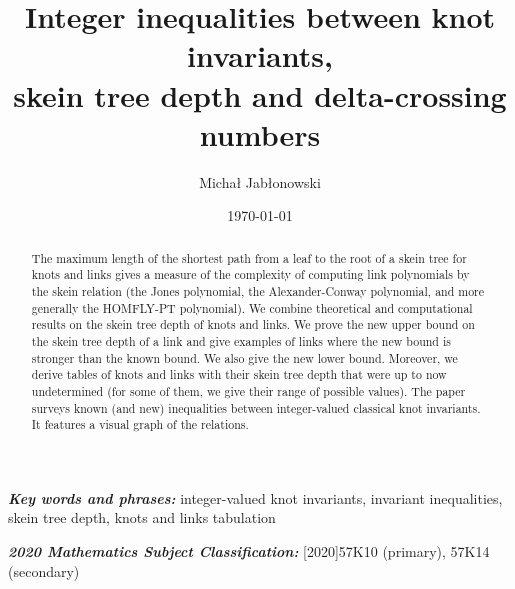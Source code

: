 \documentclass[pdftex, a4paper, 12pt, oneside]{amsart}
\numberwithin{equation}{section}
\theoremstyle{plain}
\theoremstyle{definition}
\providecommand{\keywords}[1]{\textbf{\textit{Key words and phrases:}} #1}
\providecommand{\subjclass}[1]{\textbf{\textit{2020 Mathematics Subject Classification:}} #1}
\begin{document}
	
	
	
\title[Inequalities between knot invariants, skein tree depth and delta-crossing numbers]{Integer inequalities between knot invariants,\\ skein tree depth and delta-crossing numbers}

\author{Micha{\l} Jab{\l}onowski}

\address{Institute of Mathematics, Faculty of Mathematics, Physics and Informatics,\newline University of Gda\'nsk, 80-308 Gda\'nsk, Poland}

\keywords{integer-valued knot invariants, invariant inequalities, skein tree depth, knots and links tabulation}

\subjclass[2020]{57K10 (primary), 57K14 (secondary)}


\date{\today}



\maketitle



	
	\begin{abstract}
		The maximum length of the shortest path from a leaf to the root of a skein tree for knots and links gives a measure of the complexity of computing link polynomials by the skein relation (the Jones polynomial, the Alexander-Conway polynomial, and more generally the HOMFLY-PT polynomial). We combine theoretical and computational results on the skein tree depth of knots and links.
		We prove the new upper bound on the skein tree depth of a link and give examples of links where the new bound is stronger than the known bound. We also give the new lower bound. Moreover, we derive tables of knots and links with their skein tree depth that were up to now undetermined (for some of them, we give their range of possible values).
		The paper surveys known (and new) inequalities between integer-valued classical knot invariants. It features a visual graph of the relations.
	\end{abstract}
	
\end{document}
